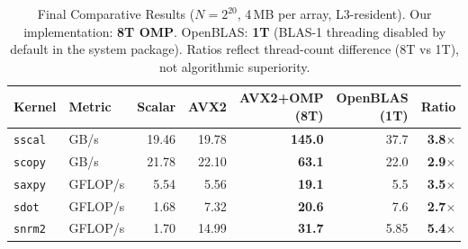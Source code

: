 \documentclass[11pt,a4paper]{article}
\begin{document}
\begin{table}[h]
\centering
\caption{Final Comparative Results ($N = 2^{20}$, 4\,MB per array, L3-resident). Our implementation: \textbf{8T OMP}.
  OpenBLAS: \textbf{1T} (BLAS-1 threading disabled by default in the system package).
  Ratios reflect thread-count difference (8T vs 1T), not algorithmic superiority.}
\label{tab:blas1_final}
\small
\begin{tabular}{llrrrrr}
\toprule
Kernel & Metric & Scalar & AVX2 & AVX2+OMP (8T) & OpenBLAS (1T) & Ratio \\
\midrule
\texttt{sscal} & GB/s     & 19.46 & 19.78 & \textbf{145.0}  & 37.7  & \textbf{3.8$\times$} \\
\texttt{scopy} & GB/s     & 21.78 & 22.10 & \textbf{63.1}   & 22.0  & \textbf{2.9$\times$} \\
\texttt{saxpy} & GFLOP/s  & 5.54  & 5.56  & \textbf{19.1}   & 5.5   & \textbf{3.5$\times$} \\
\texttt{sdot}  & GFLOP/s  & 1.68  & 7.32  & \textbf{20.6}   & 7.6   & \textbf{2.7$\times$} \\
\texttt{snrm2} & GFLOP/s  & 1.70  & 14.99 & \textbf{31.7}   & 5.85  & \textbf{5.4$\times$} \\
\bottomrule
\end{tabular}
\end{table}
\end{document}
